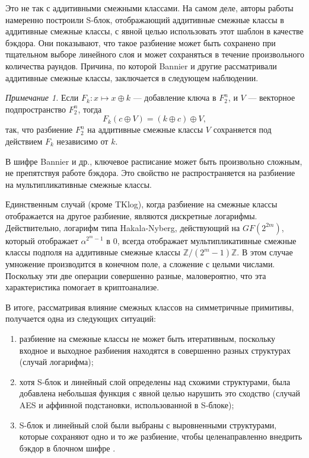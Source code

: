 Это не так с аддитивными смежными классами. На самом деле, авторы работы \cite{BBF16} намеренно построили S-блок, отображающий аддитивные смежные классы в аддитивные смежные классы, с явной целью использовать этот шаблон в качестве бэкдора. Они показывают, что такое разбиение может быть сохранено при тщательном выборе линейного слоя и может сохраняться в течение произвольного количества раундов. Причина, по которой Bannier и другие рассматривали аддитивные смежные классы, заключается в следующем наблюдении.

\textit{Примечание 1.} Если \(F_k: x \mapsto x \oplus k\) — добавление ключа в $F^n_2$, и \(V\) — векторное подпространство $F^n_2$, тогда
\[
F_k(c \oplus V) = (k \oplus c) \oplus V,
\]
так, что разбиение $F^n_2$ на аддитивные смежные классы \(V\) сохраняется под действием \(F_k\) независимо от \(k\).

В шифре Bannier и др., ключевое расписание может быть произвольно сложным, не препятствуя работе бэкдора. Это свойство не распространяется на разбиение на мультипликативные смежные классы.

Единственным случай (кроме TKlog), когда разбиение на смежные классы отображается на другое разбиение, являются дискретные логарифмы. Действительно, логарифм типа Hakala-Nyberg, действующий на $GF(2^{2m})$, который отображает \(\alpha^{2^m-1}\) в $0$, всегда отображает мультипликативные смежные классы подполя на аддитивные смежные классы $\mathbb{Z}/(2^m - 1)\mathbb{Z}$. В этом случае умножение производится в конечном поле, а сложение с целыми числами. Поскольку эти две операции совершенно разные, маловероятно, что эта характеристика помогает в криптоанализе.

В итоге, рассматривая влияние смежных классов на симметричные примитивы, получается одна из следующих ситуаций:
\begin{enumerate}
    \item разбиение на смежные классы не может быть итеративным, поскольку входное и выходное разбиения находятся в совершенно разных структурах (случай логарифма);
    \item хотя S-блок и линейный слой определены над схожими структурами, была добавлена небольшая функция с явной целью нарушить это сходство (случай AES и аффинной подстановки, использованной в S-блоке);
    \item S-блок и линейный слой были выбраны с выровненными структурами, которые сохраняют одно и то же разбиение, чтобы целенаправленно внедрить бэкдор в блочном шифре \cite{BBF16}.
\end{enumerate}

